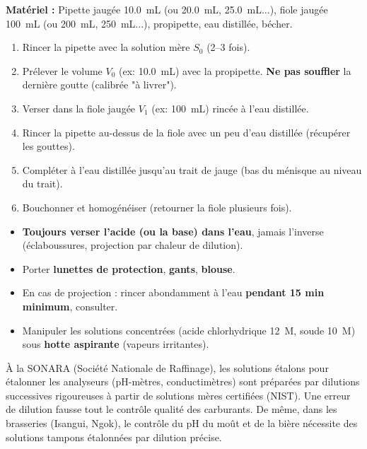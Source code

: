 \documentclass[11pt]{article}
\begin{document}
\begin{methode}[Protocole de dilution au dixième ($f=10$)]
\textbf{Matériel :} Pipette jaugée \SI{10,0}{mL} (ou \SI{20,0}{mL}, \SI{25,0}{mL}...), fiole jaugée \SI{100}{mL} (ou \SI{200}{mL}, \SI{250}{mL}...), propipette, eau distillée, bécher.
\begin{enumerate}
    \item Rincer la pipette avec la solution mère $S_0$ (2--3 fois).
    \item Prélever le volume $V_0$ (ex: \SI{10,0}{mL}) avec la propipette. \textbf{Ne pas souffler} la dernière goutte (calibrée "à livrer").
    \item Verser dans la fiole jaugée $V_1$ (ex: \SI{100}{mL}) rincée à l'eau distillée.
    \item Rincer la pipette au-dessus de la fiole avec un peu d'eau distillée (récupérer les gouttes).
    \item Compléter à l'eau distillée jusqu'au trait de jauge (bas du ménisque au niveau du trait).
    \item Bouchonner et homogénéiser (retourner la fiole plusieurs fois).
\end{enumerate}
\end{methode}

\begin{attention}
\begin{itemize}
    \item \textbf{Toujours verser l'acide (ou la base) dans l'eau}, jamais l'inverse (éclaboussures, projection par chaleur de dilution).
    \item Porter \textbf{lunettes de protection}, \textbf{gants}, \textbf{blouse}.
    \item En cas de projection : rincer abondamment à l'eau \textbf{pendant 15 min minimum}, consulter.
    \item Manipuler les solutions concentrées (acide chlorhydrique \SI{12}{M}, soude \SI{10}{M}) sous \textbf{hotte aspirante} (vapeurs irritantes).
\end{itemize}
\end{attention}

\begin{savaistu}
À la SONARA (Société Nationale de Raffinage), les solutions étalons pour étalonner les analyseurs (pH-mètres, conductimètres) sont préparées par dilutions successives rigoureuses à partir de solutions mères certifiées (NIST). Une erreur de dilution fausse tout le contrôle qualité des carburants. De même, dans les brasseries (Isangui, Ngok), le contrôle du pH du moût et de la bière nécessite des solutions tampons étalonnées par dilution précise.
\end{savaistu}
\end{document}
